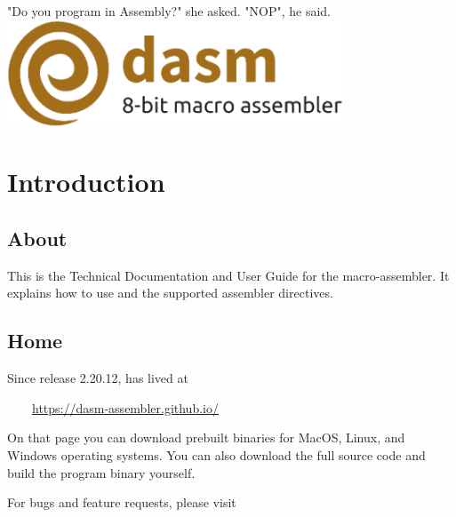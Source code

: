 \begin{savequote}
\sffamily
"Do you program in Assembly?" she asked.\newline
"NOP", he said.\\[0.5cm]



\includegraphics[width=0.75\textwidth]{dasm-logo.png}


\end{savequote}



\chapter{Introduction}



\section{About} 

This is the Technical Documentation and User Guide for the \dasm macro-assembler. It explains how
to use \dasm and the supported assembler directives.

\section{Home}

Since release 2.20.12, \dasm has lived at

~~~~\url{https://dasm-assembler.github.io/}

On that page you can download prebuilt binaries for MacOS, Linux, and Windows operating systems. You can also download the full source code and build the program binary yourself.

\label{changelog:20200913bugs}
For bugs and feature requests, please visit

